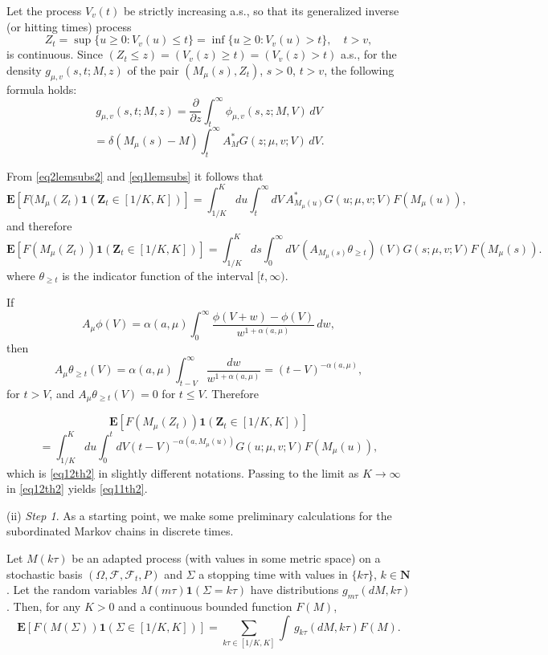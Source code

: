 \documentclass[12pt]{article}
\def\FC{\mathcal{F}}
\def\E{\mathbf{E}}
\def\N{\mathbf{N}}
\def\Z{\mathbf{Z}}
\def\1{\mathbf{1}}
\def\al{\alpha}
\def\pa{\partial}
\def\de{\delta}
\newcommand{\Si}{\Sigma}
\newcommand{\Om}{\Omega}
\numberwithin{equation}{section}
\begin{document}
Let the process $V_v(t)$ be strictly increasing a.s., so that its generalized inverse
(or hitting times) process
\[
Z_t=\sup\{ u\ge 0: V_v(u)\le t\}=\inf\{ u\ge 0: V_v(u)> t\}, \quad t>v,
\]
is continuous. Since $(Z_t\le z)=(V_v(z)\ge t)=(V_v(z)>t)$ a.s.,
for the density $g_{\mu,v}(s,t;M,z)$ of the pair $(M_{\mu}(s),Z_t)$, $s> 0$, $t> v$,
the following formula holds:
\[
g_{\mu,v}(s,t;M,z)=  \frac{\pa}{\pa z} \int_t^{\infty} \phi_{\mu,v}(s,z;M,V) \, dV
\]
\begin{equation}
 \label{eq2lemsubs2}
=\de (M_{\mu}(s)-M) \int_t^{\infty} A^*_{M}G(z;\mu,v; V) \, dV.
\end{equation}

From \eqref{eq2lemsubs2} and  \eqref{eq1lemsubs} it follows that
\begin{equation}
 \label{eq1thsubs}
\E [F(M_{\mu}(Z_t)\1(\Z_t\in [1/K,K])]
=  \int_{1/K}^K du \int_t^{\infty} dV \, A^*_{M_{\mu}(u)}G(u;\mu,v;V) F(M_{\mu}(u)),
\end{equation}
and therefore
\[
\E [F(M_{\mu}(Z_t))\1(\Z_t\in [1/K,K])]
= \int_{1/K}^K ds \int_0^{\infty} dV \, (A_{M_{\mu}(s)}\theta_{\ge t})(V)G(s;\mu,v; V) F(M_{\mu}(s)).
\]
where $\theta_{\ge t}$ is the indicator function of the interval $[t,\infty)$.

If
\begin{equation}
 \label{eq1lemsubs2}
 A_{\mu} \phi(V) =\al (a,\mu) \int_0^{\infty} \frac{\phi (V+w)-\phi(V)}{w^{1+\al (a,\mu)}} \, dw,
\end{equation}
then
\[
A_{\mu} \theta_{\ge t}(V)=\al (a,\mu) \int_{t-V}^{\infty} \frac{dw}{w^{1+\al (a,\mu)}}
= (t-V)^{-\al (a, \mu)},
\]
for $t>V$, and $A_{\mu}\theta_{\ge t}(V)=0$ for $t\le V$.
Therefore

\[
\E [F(M_{\mu}(Z_t))\1(\Z_t\in [1/K,K])]
\]
\begin{equation}
	\label{eq2thsubs}
 =\int_{1/K}^K du \int_0^t dV (t-V)^{-\al (a, M_{\mu}(u))} G(u;\mu,v; V) F(M_{\mu}(u)),
\end{equation}
which is \eqref{eq12th2} in slightly different notations.
Passing to the limit as $K\to \infty$ in \eqref{eq12th2} yields \eqref{eq11th2}.

(ii) {\it  Step 1}. As a starting point,
we make some preliminary calculations for the subordinated Markov chains in discrete times.

Let $M(k\tau)$ be an adapted process (with values in some metric space)
on a stochastic basis $(\Om, \FC, \FC_t, P)$ and $\Si$
a stopping time with values in $\{k\tau\}$, $k\in \N$.
Let the random variables  $M(m\tau) \1(\Si=k\tau)$ have distributions $g_{m\tau}(dM, k\tau)$.
Then, for any $K>0$ and a continuous bounded function $F(M)$,
\begin{equation}
 \label{eq1lemsubsdis}
\E [F(M(\Si))\1(\Si\in [1/K,K])]= \sum_{k \tau \in [1/K,K]} \int \, g_{k\tau}(dM, k\tau) F(M).
\end{equation}
\end{document}
